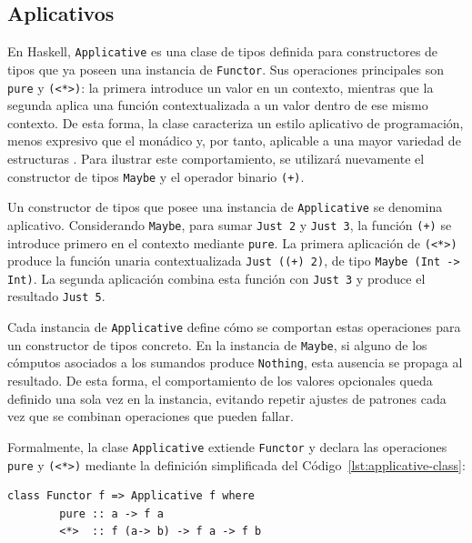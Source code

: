 \subsection{Aplicativos}

En \textsf{Haskell}, \texttt{Applicative} es una clase de tipos definida para constructores de tipos que ya poseen una instancia de \texttt{Functor}. Sus operaciones principales son \texttt{pure} y \verb|(<*>)|: la primera introduce un valor en un contexto, mientras que la segunda aplica una función contextualizada a un valor dentro de ese mismo contexto. De esta forma, la clase caracteriza un estilo aplicativo de programación, menos expresivo que el monádico y, por tanto, aplicable a una mayor variedad de estructuras \cite{McBride2008}. Para ilustrar este comportamiento, se utilizará nuevamente el constructor de tipos \texttt{Maybe} y el operador binario \texttt{(+)}.

Un constructor de tipos que posee una instancia de \texttt{Applicative} se denomina aplicativo. Considerando \texttt{Maybe}, para sumar \texttt{Just 2} y \texttt{Just 3}, la función \texttt{(+)} se introduce primero en el contexto mediante \texttt{pure}. La primera aplicación de \verb|(<*>)| produce la función unaria contextualizada \texttt{Just ((+) 2)}, de tipo \verb|Maybe (Int -> Int)|. La segunda aplicación combina esta función con \texttt{Just 3} y produce el resultado \texttt{Just 5}.

Cada instancia de \texttt{Applicative} define cómo se comportan estas operaciones para un constructor de tipos concreto. En la instancia de \texttt{Maybe}, si alguno de los cómputos asociados a los sumandos produce \texttt{Nothing}, esta ausencia se propaga al resultado. De esta forma, el comportamiento de los valores opcionales queda definido una sola vez en la instancia, evitando repetir ajustes de patrones cada vez que se combinan operaciones que pueden fallar.

Formalmente, la clase \texttt{Applicative} extiende \texttt{Functor} y declara las operaciones \texttt{pure} y \verb|(<*>)| mediante la definición simplificada del Código~\ref{lst:applicative-class}:

\begin{lstlisting}[style=haskell,caption={Definición simplificada de la clase \texttt{Applicative}.},label={lst:applicative-class}]
    class Functor f => Applicative f where
        pure :: a -> f a
        <*>  :: f (a-> b) -> f a -> f b
\end{lstlisting}

